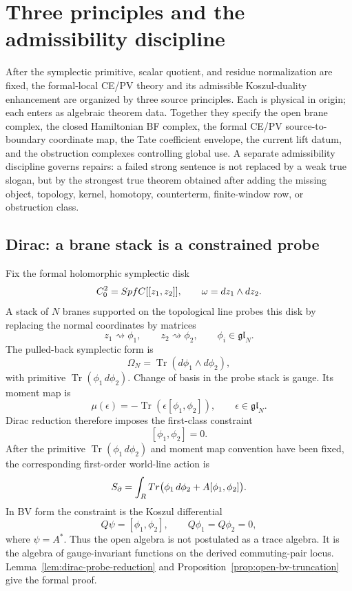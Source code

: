 \section{Three principles and the admissibility discipline}\label{sec:three-principles}

After the symplectic primitive, scalar quotient, and residue
normalization are fixed, the formal-local CE/PV theory and its
admissible Koszul-duality enhancement are
organized by three source principles.  Each is physical in origin; each
enters as algebraic theorem data.  Together they specify
the open brane complex, the closed Hamiltonian BF complex, the
formal CE/PV source-to-boundary coordinate map, the Tate coefficient envelope, the current lift
datum, and the obstruction complexes controlling global use.  A separate
admissibility discipline governs repairs: a failed strong sentence is
not replaced by a weak true slogan, but by the strongest true theorem
obtained after adding the missing object, topology, kernel, homotopy,
counterterm, finite-window row, or obstruction class.

\subsection{Dirac: a brane stack is a constrained probe}

Fix the formal holomorphic symplectic disk
\[
  C^2_0=SpfC[[z_1,z_2]],
  \qquad \omega=dz_1\wedge dz_2.
\]
A stack of \(N\) branes supported on the topological line probes this
disk by replacing the normal coordinates by matrices
\[
  z_1\rightsquigarrow\phi_1,\qquad
  z_2\rightsquigarrow\phi_2,\qquad
  \phi_i\in\mathfrak{gl}_N .
\]
The pulled-back symplectic form is
\[
  \Omega_N=\operatorname{Tr}(d\phi_1\wedge d\phi_2),
\]
with primitive \(\operatorname{Tr}(\phi_1\,d\phi_2)\). Change of basis
in the probe stack is gauge. Its moment map is
\[
  \mu(\epsilon)=-\operatorname{Tr}(\epsilon[\phi_1,\phi_2]),
  \qquad \epsilon\in\mathfrak{gl}_N .
\]
Dirac reduction therefore imposes the first-class constraint
\[
  [\phi_1,\phi_2]=0.
\]
After the primitive \(\operatorname{Tr}(\phi_1\,d\phi_2)\) and moment
map convention have been fixed, the corresponding first-order
world-line action is
\[
  S_\partial
  =\int_{R}Tr
    \bigl(\phi_1\,d\phi_2+A[\phi_1,\phi_2]\bigr).
\]
In BV form the constraint is the Koszul differential
\[
  Q\psi=[\phi_1,\phi_2],\qquad Q\phi_1=Q\phi_2=0,
\]
where \(\psi=A^*\). Thus the open algebra is not postulated as a
trace algebra. It is the algebra of gauge-invariant functions on the
derived commuting-pair locus. Lemma~\ref{lem:dirac-probe-reduction}
and Proposition~\ref{prop:open-bv-truncation} give the formal proof.

